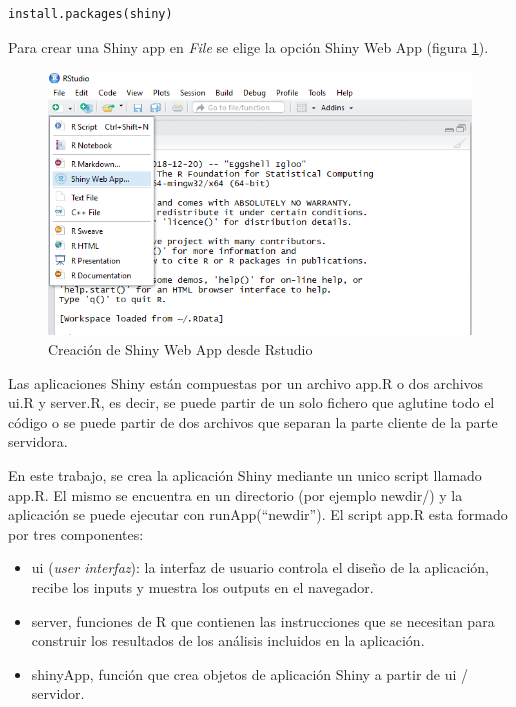 \begin{lstlisting}[frame=single]
install.packages(shiny)
\end{lstlisting}

Para crear una Shiny app en \emph{File} se elige la opción Shiny Web App (figura \ref{fig:fig32}).

\begin{figure}[h]
\begin{center}
\includegraphics[width=12cm]{./Graficos/figura4}
\end{center}
\caption{Creación de Shiny Web App desde Rstudio}
\label{fig:fig32}
\end{figure}


Las aplicaciones Shiny están compuestas por un archivo app.R o dos archivos ui.R y server.R, es decir, se puede partir de un solo fichero que aglutine todo el código o se puede partir de dos archivos que separan la parte cliente de la parte servidora.

En este trabajo, se crea la aplicación Shiny mediante un unico script llamado app.R. El mismo se encuentra en un directorio (por ejemplo newdir/) y la aplicación se puede ejecutar con runApp(``newdir''). El script app.R esta formado por tres componentes:

\begin{itemize}
\item ui (\emph{user interfaz}): la interfaz de usuario controla el diseño de la aplicación, recibe los inputs y
muestra los outputs en el navegador.
\item server, funciones de R que contienen las instrucciones que se necesitan para construir los resultados de los análisis incluidos en la aplicación.
\item shinyApp, función que crea objetos de aplicación Shiny a partir de ui / servidor.
\end{itemize}


